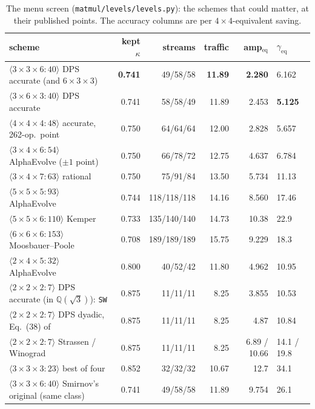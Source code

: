 \documentclass[11pt]{article}
\newcommand{\mm}[1]{\langle #1\rangle}
\newcommand{\lv}[1]{\texttt{#1}}
\begin{document}
\begin{table}[t]
\centering\footnotesize
\begin{tabular}{lrrrrl}
\toprule
scheme & kept $\kappa$ & streams & traffic & amp$_{\text{eq}}$ & $\gamma_{\text{eq}}$\\
\midrule
$\mm{3\times3\times6:40}$ DPS accurate (and $6\times3\times3$) & \textbf{0.741} & 49/58/58 & \textbf{11.89} & \textbf{2.280} & 6.162\\
$\mm{3\times6\times3:40}$ DPS accurate & 0.741 & 58/58/49 & 11.89 & 2.453 & \textbf{5.125}\\
$\mm{4\times4\times4:48}$ accurate, 262-op.\ point & 0.750 & 64/64/64 & 12.00 & 2.828 & 5.657\\
$\mm{3\times4\times6:54}$ AlphaEvolve ($\pm1$ point) & 0.750 & 66/78/72 & 12.75 & 4.637 & 6.784\\
$\mm{3\times4\times7:63}$ rational & 0.750 & 75/91/84 & 13.50 & 5.734 & 11.13\\
$\mm{5\times5\times5:93}$ AlphaEvolve & 0.744 & 118/118/118 & 14.16 & 8.560 & 17.46\\
$\mm{5\times5\times6:110}$ Kemper & 0.733 & 135/140/140 & 14.73 & 10.38 & 22.9\\
$\mm{6\times6\times6:153}$ Moosbauer--Poole & 0.708 & 189/189/189 & 15.75 & 9.229 & 18.3\\
$\mm{2\times4\times5:32}$ AlphaEvolve & 0.800 & 40/52/42 & 11.80 & 4.962 & 10.95\\
$\mm{2\times2\times2:7}$ DPS accurate (in $\mathbb{Q}(\sqrt3)$): \lv{SW} & 0.875 & 11/11/11 & 8.25 & 3.855 & 10.53\\
$\mm{2\times2\times2:7}$ DPS dyadic, Eq.~(38) of \cite{DPS24} & 0.875 & 11/11/11 & 8.25 & 4.87 & 10.84\\
$\mm{2\times2\times2:7}$ Strassen / Winograd & 0.875 & 11/11/11 & 8.25 & 6.89 / 10.66 & 14.1 / 19.8\\
$\mm{3\times3\times3:23}$ best of four & 0.852 & 32/32/32 & 10.67 & 12.7 & 34.1\\
$\mm{3\times3\times6:40}$ Smirnov's original (same class) & 0.741 & 49/58/58 & 11.89 & 9.754 & 26.1\\
\bottomrule
\end{tabular}
\caption{The menu screen (\texttt{matmul/levels/levels.py}): the schemes that
could matter, at their published points.  The accuracy columns are per
$4\times4$-equivalent saving.}
\label{tab:menu}
\end{table}
\end{document}
